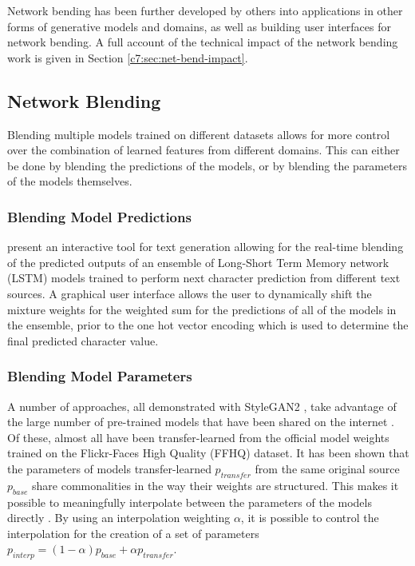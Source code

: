 Network bending has been further developed by others into applications in other forms of generative models and domains, as well as building user interfaces for network bending.
A full account of the technical impact of the network bending work is given in Section \ref{c7:sec:net-bend-impact}.

\subsection{Network Blending}
\label{survey:blending}

Blending multiple models trained on different datasets allows for more control over the combination of learned features from different domains. 
This can either be done by blending the predictions of the models, or by blending the parameters of the models themselves.

\subsubsection{Blending Model Predictions} 

\citet{akten2016real} present an interactive tool for text generation allowing for the real-time blending of the predicted outputs of an ensemble of Long-Short Term Memory network (LSTM) models \citep{hochreiter1997long} trained to perform next character prediction from different text sources. 
A graphical user interface allows the user to dynamically shift the mixture weights for the weighted sum for the predictions of all of the models in the ensemble, prior to the one hot vector encoding which is used to determine the final predicted character value.

\subsubsection{Blending Model Parameters} 

A number of approaches, all demonstrated with StyleGAN2 \citep{karras2019analyzing}, take advantage of the large number of pre-trained models that have been shared on the internet \citep{pinkney2020awesome}. 
Of these, almost all have been transfer-learned from the official model weights trained on the Flickr-Faces High Quality (FFHQ) dataset.
It has been shown that the parameters of models transfer-learned $p_{transfer}$ from the same original source $p_{base}$ share commonalities in the way their weights are structured. 
This makes it possible to meaningfully interpolate between the parameters of the models directly \citep{aydao2020interp}. 
By using an interpolation weighting $\alpha$, it is possible to control the interpolation for the creation of a set of parameters $p_{interp} = (1 - \alpha)p_{base} + \alpha p_{transfer}$. 

